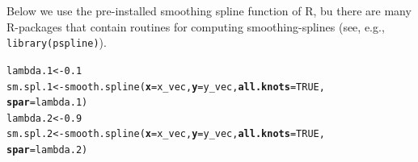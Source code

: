 \documentclass[14pt]{extreport}\usepackage[]{graphicx}\usepackage[]{xcolor}
\makeatletter
\newcommand{\hlnum}[1]{\textcolor[rgb]{0.69,0.494,0}{#1}}%
\newcommand{\hlstd}[1]{\textcolor[rgb]{0,0,0}{#1}}%
\newcommand{\hlkwb}[1]{\textcolor[rgb]{0,0.341,0.682}{#1}}%
\newcommand{\hlkwc}[1]{\textcolor[rgb]{0,0,0}{\textbf{#1}}}%
\newcommand{\hlkwd}[1]{\textcolor[rgb]{0.004,0.004,0.506}{#1}}%
\newenvironment{kframe}{%
 \def\at@end@of@kframe{}%
 \ifinner\ifhmode%
  \def\at@end@of@kframe{\end{minipage}}%
  \begin{minipage}{\columnwidth}%
 \fi\fi%
 \def\FrameCommand##1{\hskip\@totalleftmargin \hskip-\fboxsep
 \colorbox{shadecolor}{##1}\hskip-\fboxsep
     \hskip-\linewidth \hskip-\@totalleftmargin \hskip\columnwidth}%
 \MakeFramed {\advance\hsize-\width
   \@totalleftmargin\z@ \linewidth\hsize
   \@setminipage}}%
 {\par\unskip\endMakeFramed%
 \at@end@of@kframe}
\newenvironment{knitrout}{}{} %
\makeatother
\begin{document}
\bigskip

Below we use the pre-installed smoothing spline function of R, bu there are many R-packages that contain routines for computing smoothing-splines (see, e.g., \texttt{library(pspline)}). 
\begin{knitrout}
\color{fgcolor}\begin{kframe}
\begin{alltt}
\hlstd{lambda.1} \hlkwb{<-} \hlnum{0.1}
\hlstd{sm.spl.1} \hlkwb{<-} \hlkwd{smooth.spline}\hlstd{(}\hlkwc{x}\hlstd{=x_vec,} \hlkwc{y}\hlstd{=y_vec,} \hlkwc{all.knots}\hlstd{=}\hlnum{TRUE}\hlstd{,}
                          \hlkwc{spar} \hlstd{= lambda.1)}
\hlstd{lambda.2} \hlkwb{<-} \hlnum{0.9}
\hlstd{sm.spl.2} \hlkwb{<-} \hlkwd{smooth.spline}\hlstd{(}\hlkwc{x}\hlstd{=x_vec,} \hlkwc{y}\hlstd{=y_vec,} \hlkwc{all.knots}\hlstd{=}\hlnum{TRUE}\hlstd{,}
                          \hlkwc{spar} \hlstd{= lambda.2)}
\end{alltt}
\end{kframe}
\end{knitrout}

\newpage
\end{document}

